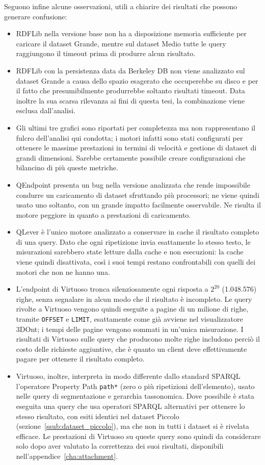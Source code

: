 \par Seguono infine alcune osservazioni, utili a chiarire dei risultati che possono generare confusione:
\begin{itemize}
\item RDFLib nella versione base non ha a disposizione memoria sufficiente per caricare il dataset Grande, mentre sul
dataset Medio tutte le query raggiungono il timeout prima di produrre alcun risultato.
\item RDFLib con la persistenza data da Berkeley DB non viene analizzato sul dataset Grande a causa dello spazio esagerato
che occuperebbe su disco e per il fatto che presumibilmente produrrebbe soltanto risultati timeout. Data inoltre la sua scarsa
rilevanza ai fini di questa tesi, la combinazione viene esclusa dall'analisi.
\item Gli ultimi tre grafici sono riportati per completezza ma non rappresentano il fulcro dell'analisi qui condotta; i motori infatti
sono stati configurati per ottenere le massime prestazioni in termini di velocità e gestione di dataset di grandi dimensioni.
Sarebbe certamente possibile creare configurazioni che bilancino di più queste metriche.
\item QEndpoint presenta un bug nella versione analizzata che rende impossibile condurre un caricamento di dataset sfruttando
più processori; ne viene quindi usato uno soltanto, con un grande impatto facilmente osservabile. Ne risulta il motore
peggiore in quanto a prestazioni di caricamento.
\item QLever è l'unico motore analizzato a conservare in cache il risultato completo di una query. Dato che
ogni ripetizione invia esattamente lo stesso testo, le misurazioni sarebbero state letture dalla cache e non
esecuzioni: la cache viene quindi disattivata, così i suoi tempi restano confrontabili con quelli dei motori
che non ne hanno una.
\item L'endpoint di Virtuoso tronca silenziosamente ogni risposta a $2^{20}$ (1.048.576) righe, senza segnalare in alcun modo
che il risultato è incompleto. Le query rivolte a Virtuoso vengono quindi eseguite a pagine di un milione di righe, tramite
\texttt{OFFSET} e \texttt{LIMIT}, esattamente come già avviene nel visualizzatore 3DOnt; i tempi delle pagine vengono sommati
in un'unica misurazione. I risultati di Virtuoso sulle query che producono molte righe includono perciò il costo delle richieste
aggiuntive, che è quanto un client deve effettivamente pagare per ottenere il risultato completo.
\item Virtuoso, inoltre, interpreta in modo differente dallo standard SPARQL l'operatore Property Path \texttt{path*} (zero o più 
ripetizioni dell'elemento), usato nelle query di segmentazione e gerarchia tassonomica. Dove possibile è stata eseguita una 
query che usa operatori SPARQL alternativi per ottenere lo stesso risultato, con esiti identici nel dataset
Piccolo (sezione~\ref{ssub:dataset_piccolo}), ma che non in tutti i dataset si è rivelata efficace. Le prestazioni di Virtuoso
su queste query sono quindi da considerare solo dopo aver valutato la correttezza dei suoi risultati, disponibili nell'appendice~\ref{cha:attachment}.
\end{itemize}
